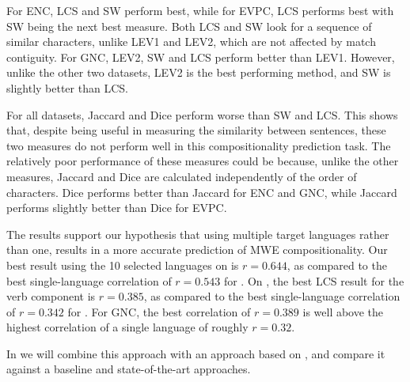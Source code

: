 \documentclass[output=paper,modfonts,nonflat]{langsci/langscibook}
\begin{document}

For ENC, LCS and SW perform best, while for EVPC, LCS performs best
with SW being the next best measure. Both LCS and
SW look for a sequence of similar characters, unlike LEV1 and LEV2, 
which are not affected by match contiguity. For GNC, LEV2, SW and LCS
perform better than LEV1. However, unlike the other two datasets, LEV2
is the best performing method, and SW is slightly better than LCS.

For all datasets, Jaccard and Dice perform worse than SW and LCS. This
shows that, despite being useful in measuring the similarity between
sentences, these two measures do not perform well in this
compositionality prediction task. The relatively poor performance of
these measures could be because, unlike the other measures, Jaccard and
Dice are calculated independently of the order of characters. Dice
performs better than Jaccard for ENC and GNC, while Jaccard performs
slightly better than Dice for EVPC. 


The results support our hypothesis that using multiple target
languages rather than one, results in a more accurate prediction of
MWE compositionality. Our best result using the 10 selected languages
on \REDDY is $r = 0.644$, as compared to the best single-language
correlation of $r = 0.543$ for . On \BANNARD, the best LCS result
for the verb component is $r = 0.385$, as compared to the best
single-language correlation of $r = 0.342$ for . For GNC, the best
correlation of $r = 0.389$ is well above the highest correlation of a single
language of roughly $r = 0.32$.

In  we will combine this 
approach with an approach based on , and
compare it against a baseline and state-of-the-art approaches.

\end{document}

